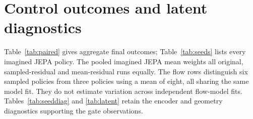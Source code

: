 \begin{table}[ht]
\centering
\caption{Real-gate observation and torso controls: final walls per episode and survival, mean
$\pm$ standard deviation over policies; discovery means final survival above $50\%$.
All policies use $1{,}499{,}136$ real transitions.}
\label{tab:latentctl}
\end{table}

\setcounter{topnumber}{4}
\setcounter{totalnumber}{5}
\section{Control outcomes and latent diagnostics}
\label{app:round2}

Table~\ref{tab:paired} gives aggregate final outcomes; Table~\ref{tab:seeds} lists every
imagined JEPA policy. The pooled imagined JEPA mean weights all original, sampled-residual and
mean-residual runs equally. The flow rows distinguish six sampled policies from three policies
using a mean of eight, all sharing the same model fit. They do not estimate variation across
independent flow-model fits. Tables~\ref{tab:seeddiag} and \ref{tab:latent} retain the encoder
and geometry diagnostics supporting the gate observations.

\begin{table}[ht]
\centering
\caption{Final control outcomes in the real gate, mean $\pm$ standard deviation over policy runs.
Imagined training uses $1{,}228{,}800$ transitions per policy; real training uses $1{,}499{,}136$.
Model-fit counts and policy-run counts identify distinct replication levels.}
\label{tab:paired}
\end{table}

\begin{table}[ht]
\centering
\caption{Every imagined JEPA policy at its final checkpoint: survival (percent) and walls per
episode by encoder seed, predictor variant and PPO seed. Each cell uses $256$ real episodes.}
\label{tab:seeds}
\end{table}

\begin{table}[ht]
\centering
\caption{Grid-JEPA diagnostics by encoder seed. Wall amplitude and total teacher-forced residual
are squared distances at future steps $1$ and $8$; decoded intensity uses steps $1$ and $2$.
The wall coordinate has endpoints $0$ (wall absent) and $1$ (true encoding).
Head AUC compares each death cause with alive transitions; PPO wall counts pool predictor variants.}
\label{tab:seeddiag}
\end{table}

